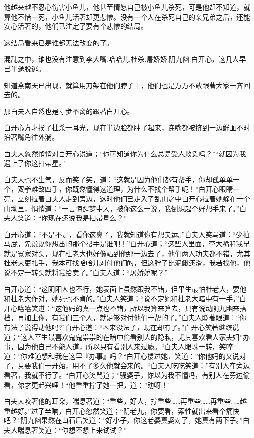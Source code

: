 \documentclass[12pt,oneside]{book}
\begin{document}
他越来越不忍心伤害小鱼儿，他甚至情愿自己被小鱼儿杀死，可是他却不知道，就算他不惜一死，小鱼儿活著却更悲惨。没有一个人在杀死自己的亲兄弟之后，还能安心活著的，他们已注定了要有个悲惨的结局。

这结局看来已是谁都无法改变的了。

混乱之中，谁也没有注意到李大嘴.哈哈儿.杜杀.屠娇娇.阴九幽.白开心，这几人早已半途脱逃。

知道燕南天已出现，就算用刀架在他们脖子上，他们也是万万不敢跟著大家一齐回去的。

那白夫人自然也是寸步不离的跟著白开心。

白开心方才挨了杜杀一耳光，现在半边脸都肿了起来，连嘴都被挤到一边鲜血不时沿著嘴角往外淌。

白夫人忽然悄悄对白开心说道；``你可知道你为什么总是受人欺负吗？''``就因为我遇上了你这扫帚星。''

白夫人也不生气，反而笑了笑，道：``这就是因为他们都有帮手，你却孤单单一个，双拳难敌四手，你既然懂得这道理，为什么不找个帮手呢！''白开心眼睛一亮，立刻拉著白夫人走到旁边，这时他们已走入了乱山之中白开心拉著她躲在一个山坳里，悄悄道：``一言惊醒梦中人，被你这么一说，我倒想起个好帮手来了。''白夫人笑道：``你现在还说我是扫帚星么？''

白开心道；``不是不是，看你这鼻子，我就知道你有帮夫运。''白夫人笑骂道：``少拍马屁，先说说你想出的那个帮手是谁吧！''白开心道；``这些人里面，李大嘴和我早就是冤家对头，现在杜老大也好像站到他那一边去了，他们两人功夫都不错，尤其杜老大更扎手，我本可找哈哈儿对付他们的，但这胖子比泥鳅还滑，我若找他，他说不定一转头就将我给卖了。''白夫人道：``屠娇娇呢？''

白开心道：``这阴阳人也不行，她表面上虽然跟我不错，但平生最怕杜老大，要他和杜老大作对，她死也不肯的。''白夫人笑道；``说不定她和杜老大暗中有一手。''白开心嘻嘻笑道：``这他妈的真一点也不错，所以我算来算去，只有说动阴九幽来搭档，再加上你，有我们三个人，就足够对付他们一帮的了。''白夫人眨著眼道：``你有法子说得动他吗?''白开心道：``本来没法子，现在却有了。''白开心笑著继缤说道；``这人平生最喜欢鬼鬼祟祟的在暗中偷看别人的隐私，尤其喜欢看人家夫妇''办事，因为他自己不能人道，所以只有看别人来过瘾。``白夫人眼珠一转，笑啐道：''你难道想和我在这里『办事』吗？``白开心搂过她，笑道：''你他妈的又说对了，只要我们一开始，用不了多久他就会来的。``白夫人吃吃笑道：''有别人在旁边看著，我就不行了。``白开心笑骂道；''骚婆子，你以为我不懂吗，有别人在旁边偷看，你才更起兴哩！``他重重拧了她一把，道：''动呀！"

白夫人咬著他的耳朵，喘息著道：``重些，好人，拧重些\ldots\ldots 再重些\ldots\ldots 再重些\ldots\ldots 越重越好。''过了半晌，白开心忽然笑道；``阴老九，你要看，索性就出来看个痛快吧？''阴九幽果然在山石后笑道：``好小子，你这老婆真娶对了，她真有两下子。''白夫人喘息著笑道：``你想不想上来试试？''
\end{document}
